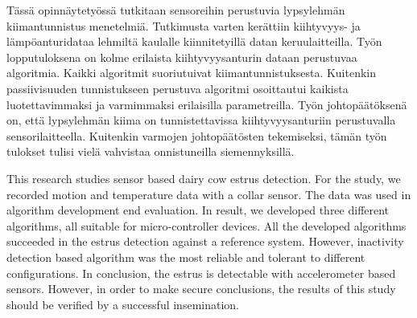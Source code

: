 
\begin{abstractpage}[finnish]
Tässä opinnäytetyössä tutkitaan sensoreihin perustuvia lypsylehmän kiimantunnistus menetelmiä. Tutkimusta varten kerättiin kiihtyvyys- ja lämpöanturidataa lehmiltä kaulalle kiinnitetyillä datan keruulaitteilla. Työn lopputuloksena on kolme erilaista kiihtyvyysanturin dataan perustuvaa algoritmia. Kaikki algoritmit suoriutuivat kiimantunnistuksesta. Kuitenkin passiivisuuden tunnistukseen perustuva algoritmi osoittautui kaikista luotettavimmaksi ja varmimmaksi erilaisilla parametreilla. Työn johtopäätöksenä on, että lypsylehmän kiima on tunnistettavissa kiihtyvyysanturiin perustuvalla sensorilaitteella. Kuitenkin varmojen johtopäätösten tekemiseksi, tämän työn tulokset tulisi vielä vahvistaa onnistuneilla siemennyksillä.
\end{abstractpage}

\newpage
%
\begin{abstractpage}[english]
This research studies sensor based dairy cow estrus detection. For the study, we recorded motion and temperature data with a collar sensor. The data was used in algorithm development end evaluation. In result, we developed three different algorithms, all suitable for micro-controller devices. All the developed algorithms succeeded in the estrus detection against a reference system. However, inactivity detection based algorithm was the most reliable and tolerant to different configurations. In conclusion, the estrus is detectable with accelerometer based sensors. However, in order to make secure conclusions, the results of this study should be verified by a successful insemination. 
\end{abstractpage}

